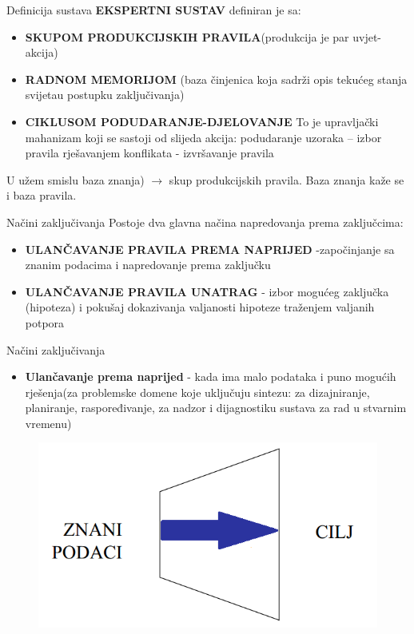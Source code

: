 \documentclass[xcolor=dvipsnames]{beamer}
\begin{document}
\begin{frame}{Definicija sustava}
\textbf{EKSPERTNI SUSTAV} definiran je sa:
\begin{itemize}
	\item \textbf{ SKUPOM PRODUKCIJSKIH PRAVILA}(produkcija je par uvjet-akcija)
	\item \textbf{RADNOM MEMORIJOM} (baza činjenica koja sadrži opis tekućeg stanja svijetau postupku zaključivanja)
	\item \textbf{CIKLUSOM PODUDARANJE-DJELOVANJE} To je upravljački mahanizam koji se sastoji od slijeda akcija: podudaranje uzoraka  – izbor pravila rješavanjem konflikata - izvršavanje pravila 
\end{itemize}

 U užem smislu baza znanja) $\rightarrow$ skup produkcijskih pravila. 
Baza znanja kaže se i baza pravila.
\end{frame}



\begin{frame}{Načini zaključivanja}
Postoje dva glavna načina napredovanja prema 
zaključcima:
\begin{itemize}
\item \textbf{ULANČAVANJE PRAVILA PREMA NAPRIJED} -započinjanje sa znanim podacima i napredovanje prema zaključku
\item \textbf{ULANČAVANJE PRAVILA UNATRAG} - izbor mogućeg zaključka (hipoteza) i pokušaj dokazivanja valjanosti hipoteze traženjem valjanih  potpora
\end{itemize}
\end{frame}


\begin{frame}{Načini zaključivanja}

\begin{itemize}
\item \textbf{Ulančavanje prema naprijed} - kada ima malo podataka i puno mogućih rješenja(za problemske domene koje uključuju sintezu: za dizajniranje, planiranje, raspoređivanje, za nadzor i dijagnostiku sustava za rad u stvarnim vremenu)
\end{itemize}


\begin{figure}
\center
\includegraphics[scale=0.5]{img/naprijed.png}
\end{figure}

\end{frame}
\end{document}
